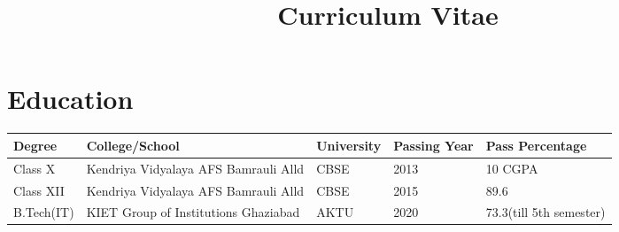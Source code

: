 \documentclass[11pt,a4paper,sans]{moderncv} %
\title{Curriculum Vitae}
\begin{document}

\makecvtitle %


\section{Education}










\setlength{\arrayrulewidth}{1mm}
\setlength{\tabcolsep}{18pt}
\renewcommand{\arraystretch}{1.5}
\hspace*{-2.5cm}
\begin{tabular}{ |p{3cm}|p{3cm}|p{3cm}|p{3cm}|p{2cm}|  }
		
		
		\hline
		Degree & College/School & University & Passing Year & Pass Percentage \\
		\hline
		Class X & Kendriya Vidyalaya AFS Bamrauli Alld & CBSE & 2013 & 10 CGPA \\
		Class XII & Kendriya Vidyalaya AFS Bamrauli Alld   & CBSE & 2015 & 89.6\\
		B.Tech(IT) & KIET Group of Institutions Ghaziabad & AKTU & 2020 & 73.3(till 5th semester)\\
		
		\hline
\end{tabular}
\end{document}
